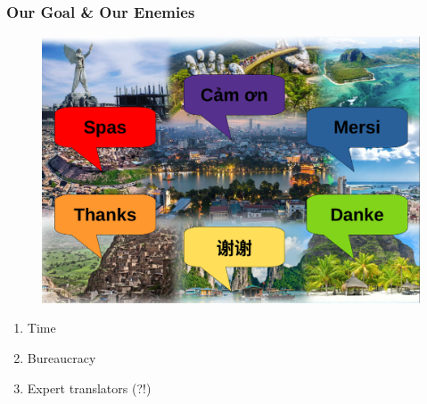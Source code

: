 \documentclass[aspectratio=169]{beamer}
\begin{document}
\begin{frame}[fragile]
\begin{figure}
        \hfill
        \hfill
        \hfill
        \hfill
        \hfill
        \hfill
    \end{figure}
\end{frame}

\begin{frame}[fragile]
	\frametitle{Our Goal \& Our Enemies}
	\begin{minipage}{.49\textwidth}
    \begin{figure}
	    \centering
	    \includegraphics[width=1.0\textwidth]{images/title-banner.png}
	\end{figure}
	\end{minipage}
	\begin{minipage}{.49\textwidth}
	\begin{enumerate}
		\item Time
		\item Bureaucracy
		\item Expert translators (?!)
	\end{enumerate}
	\end{minipage}
\end{frame}
\end{document}
